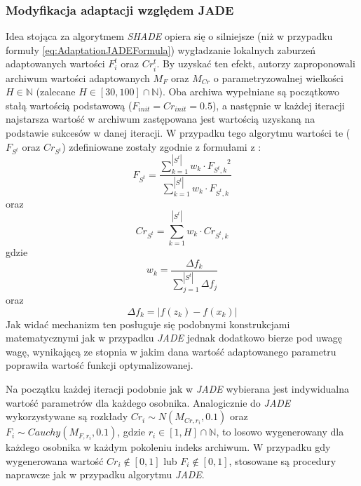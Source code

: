 \documentclass[12pt,a4paper]{report}
\begin{document}
{{{\begin{description}
\subsubsection{Modyfikacja adaptacji względem JADE}
\par{
Idea stojąca za algorytmem \emph{SHADE} opiera się o silniejsze (niż w przypadku formuły \ref{eq:AdaptationJADEFormula}) wygładzanie lokalnych zaburzeń adaptowanych wartości $F_i^t$ oraz $Cr_i^t$. By uzyskać ten efekt, autorzy zaproponowali archiwum wartości adaptowanych $M_F$ oraz $M_{Cr}$ o parametryzowalnej wielkości $H \in \mathbb{N}$ (zalecane $H \in [30, 100] \cap \mathbb{N}$). Oba archiwa wypełniane są początkowo stałą wartością podstawową ($F_{init} = Cr_{init} = 0.5$), a następnie w każdej iteracji najstarsza wartość w archiwum zastępowana jest wartością uzyskaną na podstawie sukcesów w danej iteracji. W przypadku tego algorytmu  wartości te ($F_{S^t}$ oraz $Cr_{S^t}$) zdefiniowane zostały zgodnie z formułami z \cite{JADEexMultiStart}:
\begin{equation}
F_{S^t} = \frac{\sum_{k = 1}^{|S^t|} w_k \cdot {F_{S^t,k}}^2}{\sum_{k = 1}^{|S^t|} w_k \cdot F_{S^t,k}}
\end{equation}
oraz
\begin{equation}
Cr_{S^t} = \sum_{k = 1}^{|S^t|} w_k \cdot Cr_{S^t,k}
\end{equation}
gdzie
\begin{equation}
w_k = \frac{\Delta{f_k}}{\sum_{j = 1}^{|S^t|} \Delta{f_j}}
\end{equation}
oraz
\begin{equation}
\Delta{f_k} = |f(z_k) - f(x_k)|
\end{equation}
Jak widać mechanizm ten posługuje się podobnymi konstrukcjami matematycznymi jak w przypadku \emph{JADE} jednak dodatkowo bierze pod uwagę wagę, wynikającą ze stopnia w jakim dana wartość adaptowanego parametru poprawiła wartość funkcji optymalizowanej.
}
\par{
Na początku każdej iteracji podobnie jak w \emph{JADE} wybierana jest indywidualna wartość parametrów dla każdego osobnika. Analogicznie do \emph{JADE} wykorzystywane są rozkłady $Cr_i \sim N(M_{Cr,r_i}, 0.1)$ oraz $F_i \sim Cauchy(M_{F,r_i}, 0.1)$, gdzie $r_i \in [1, H] \cap \mathbb{N}$, to losowo wygenerowany dla każdego osobnika w każdym pokoleniu indeks archiwum. W przypadku gdy wygenerowana wartość $Cr_i \notin [0,1]$ lub $F_i \notin [0,1]$, stosowane są procedury naprawcze jak w przypadku algorytmu \emph{JADE}.
}


\end{description}}}}
\end{document}

